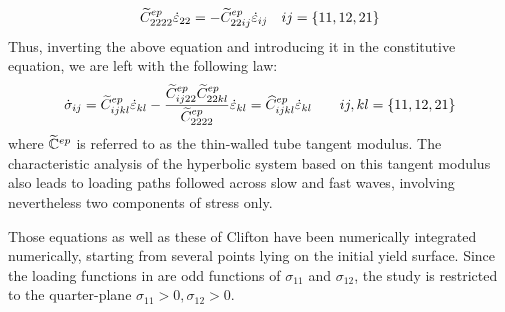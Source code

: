 \begin{equation*}
  \widetilde{C}^{ep}_{2222} \dot{\varepsilon}_{22} = - \widetilde{C}^{ep}_{22ij}\dot{\varepsilon}_{ij} \quad ij=\{11,12,21\}
\end{equation*}
Thus, inverting the above equation and introducing it in the constitutive equation, we are left with the following law:
\begin{equation}
  \label{eq:ch5_TW_tangent}
  \dot{\sigma}_{ij}=\widetilde{C}^{ep}_{ijkl} \dot{\varepsilon}_{kl} - \frac{\widetilde{C}^{ep}_{ij22}\widetilde{C}^{ep}_{22kl}}{\widetilde{C}^{ep}_{2222}}\dot{\varepsilon}_{kl}= \widehat{C}^{ep}_{ijkl} \dot{\varepsilon}_{kl}\qquad ij,kl=\{11,12,21\} 
\end{equation}
where $\widetilde{\mathbb{C}}^{ep}$ is referred to as the thin-walled tube tangent modulus.
The characteristic analysis of the hyperbolic system based on this tangent modulus also leads to loading paths followed across slow and fast waves, involving nevertheless two components of stress only.

Those equations as well as these of Clifton \cite{Clifton} have been numerically integrated numerically, starting from several points lying on the initial yield surface. Since the loading functions in \cite{Clifton} are odd functions of $\sigma_{11}$ and $\sigma_{12}$, the study is restricted to the quarter-plane $\sigma_{11}>0,\sigma_{12}>0$.

